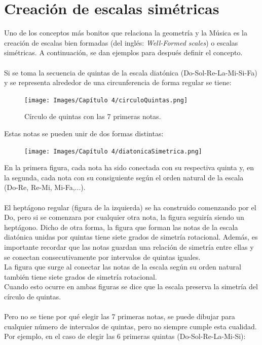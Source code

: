 \documentclass[a4paper, openright, 11pt, titlepage]{report}
\theoremstyle{definition}\newtheorem{defin}[propo]{Definition}
\theoremstyle{definition}\newtheorem{obser}[propo]{Remark}
\theoremstyle{definition}\newtheorem{ejem}[propo]{Ejemplo}
\theoremstyle{definition}\newtheorem{algoritmo}[propo]{Algoritmo}
\begin{document}
\section{Creación de escalas simétricas}
Uno de los conceptos más bonitos que relaciona la geometría y la Música es la creación de escalas bien formadas (del inglés: \textit{Well-Formed scales}) o escalas simétricas. A continuación, se dan ejemplos para después definir el concepto.\\\\
Si se toma la secuencia de quintas de la escala diatónica (Do-Sol-Re-La-Mi-Si-Fa) y se representa alrededor de una circunferencia de forma regular se tiene: 
\begin{figure}[H]
    \centering
    \texttt{[image: Images/Capítulo 4/circuloQuintas.png]}
    \caption{Círculo de quintas con las 7 primeras notas.}
\end{figure}
Estas notas se pueden unir de dos formas distintas:
\begin{figure}[H]
    \centering
    \texttt{[image: Images/Capítulo 4/diatonicaSimetrica.png]}
\end{figure}
En la primera figura, cada nota ha sido conectada con su respectiva quinta y, en la segunda, cada nota con su consiguiente según el orden natural de la escala (Do-Re, Re-Mi, Mi-Fa,...).\\\\
El heptágono regular (figura de la izquierda) se ha construido comenzando por el Do, pero si se comenzara por cualquier otra nota, la figura seguiría siendo un heptágono. Dicho de otra forma, la figura que forman las notas de la escala diatónica unidas por quintas tiene siete grados de simetría rotacional. Además, es importante recordar que las notas guardan una relación de simetría entre ellas y se conectan consecutivamente por intervalos de quintas iguales.\\
La figura que surge al conectar las notas de la escala según su orden natural también tiene siete grados de simetría rotacional.\\
Cuando esto ocurre en ambas figuras se dice que la escala preserva la simetría del círculo de quintas.\\\\
Pero no se tiene por qué elegir las 7 primeras notas, se puede dibujar para cualquier número de intervalos de quintas, pero no siempre cumple esta cualidad. Por ejemplo, en el caso de elegir las 6 primeras quintas (Do-Sol-Re-La-Mi-Si):
\end{document}
